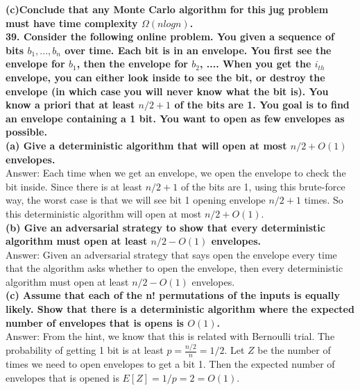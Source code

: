 \documentclass{article}
\begin{document}
\textbf{(c)Conclude that any Monte Carlo algorithm for this jug problem must have time complexity $\Omega(nlogn)$.} \\ \newline
\textbf{39. Consider the following online problem. You given a sequence of bits $b_1, ... , b_n$ over time. Each bit is in an envelope. You first see the envelope for $b_1$, then the envelope for $b_2$, .... When you get the $i_{th}$ envelope, you can either look inside to see the bit, or destroy the envelope (in which case you will never know what the bit is). You know a priori that at least $n/2 + 1$ of the bits are 1. You goal is to find an envelope containing a 1 bit. You want to open as few envelopes as possible.} \\ \newline 
\textbf{(a) Give a deterministic algorithm that will open at most $n/2 + O(1)$ envelopes.} \\ \newline
Answer: Each time when we get an envelope, we open the envelope to check the bit inside. Since there is at least $n/2 + 1$ of the bits are 1, using this brute-force way, the worst case is that we will see bit 1 opening envelope $n/2 + 1$ times. So this deterministic algorithm will open at most $n/2 + O(1)$.\\ \newline
\textbf{(b) Give an adversarial strategy to show that every deterministic algorithm must open at least $n/2 - O(1)$ envelopes.} \\ \newline
Answer: Given an adversarial strategy that says open the envelope every time that the algorithm asks whether to open the envelope, then every deterministic algorithm must open at least $n/2 - O(1)$ envelopes. \\ \newline
\textbf{(c) Assume that each of the n! permutations of the inputs is equally likely. Show that there is a deterministic algorithm where the expected number of envelopes that is opens is $O(1)$.} \\ \newline
Answer: From the hint, we know that this is related with Bernoulli trial. The probability of getting 1 bit is at least $p = \frac{n/2}{n}= 1/2$. Let $Z$ be the number of times we need to open envelopes to get a bit 1. Then the expected number of envelopes that is opened is $E[Z] = 1/p = 2 = O(1)$. \\\newline
\end{document}
